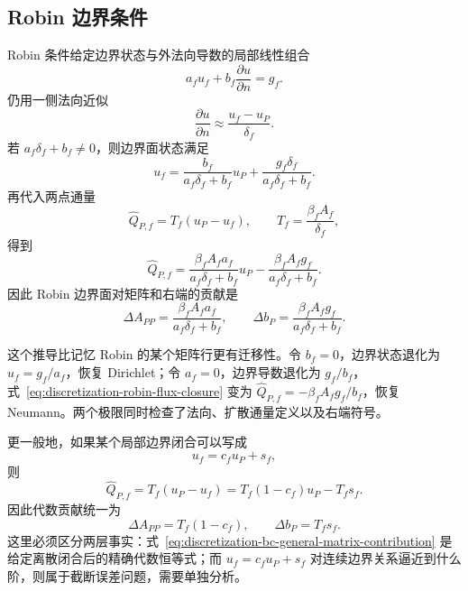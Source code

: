 \subsection{Robin 边界条件}

Robin 条件给定边界状态与外法向导数的局部线性组合
\begin{equation}
a_fu_f+b_f\frac{\partial u}{\partial n}=g_f.
\label{eq:discretization-robin-general}
\end{equation}
仍用一侧法向近似
\begin{equation}
\frac{\partial u}{\partial n}
\approx
\frac{u_f-u_P}{\delta_f}.
\end{equation}
若 $a_f\delta_f+b_f\ne0$，则边界面状态满足
\begin{equation}
\boxed{
u_f
=\frac{b_f}{a_f\delta_f+b_f}u_P
+\frac{g_f\delta_f}{a_f\delta_f+b_f}.
}
\label{eq:discretization-robin-fv-boundary-state}
\end{equation}
再代入两点通量
\begin{equation}
\widehat Q_{P,f}=T_f(u_P-u_f),
\qquad
T_f=\frac{\beta_fA_f}{\delta_f},
\label{eq:discretization-bc-transmissibility}
\end{equation}
得到
\begin{equation}
\boxed{
\widehat Q_{P,f}
=\frac{\beta_fA_fa_f}{a_f\delta_f+b_f}u_P
-\frac{\beta_fA_fg_f}{a_f\delta_f+b_f}.
}
\label{eq:discretization-robin-flux-closure}
\end{equation}
因此 Robin 边界面对矩阵和右端的贡献是
\begin{equation}
\boxed{
\Delta A_{PP}
=\frac{\beta_fA_fa_f}{a_f\delta_f+b_f},
\qquad
\Delta b_P
=\frac{\beta_fA_fg_f}{a_f\delta_f+b_f}.
}
\label{eq:discretization-robin-matrix-contribution}
\end{equation}

这个推导比记忆 Robin 的某个矩阵行更有迁移性。令 $b_f=0$，边界状态退化为 $u_f=g_f/a_f$，恢复 Dirichlet；令 $a_f=0$，边界导数退化为 $g_f/b_f$，式~\eqref{eq:discretization-robin-flux-closure} 变为 $\widehat Q_{P,f}=-\beta_fA_fg_f/b_f$，恢复 Neumann。两个极限同时检查了法向、扩散通量定义以及右端符号。

更一般地，如果某个局部边界闭合可以写成
\begin{equation}
u_f=c_fu_P+s_f,
\label{eq:discretization-bc-affine-closure}
\end{equation}
则
\begin{equation}
\widehat Q_{P,f}
=T_f(u_P-u_f)
=T_f(1-c_f)u_P-T_fs_f.
\end{equation}
因此代数贡献统一为
\begin{equation}
\boxed{
\Delta A_{PP}=T_f(1-c_f),
\qquad
\Delta b_P=T_fs_f.
}
\label{eq:discretization-bc-general-matrix-contribution}
\end{equation}
这里必须区分两层事实：式~\eqref{eq:discretization-bc-general-matrix-contribution} 是给定离散闭合后的精确代数恒等式；而 $u_f=c_fu_P+s_f$ 对连续边界关系逼近到什么阶，则属于截断误差问题，需要单独分析。

